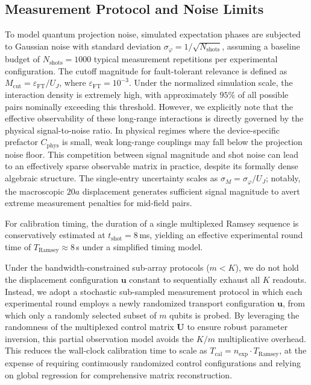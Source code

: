 \documentclass[a4paper,twocolumn,11pt]{quantumarticle}
\begin{document}
\subsection*{Measurement Protocol and Noise Limits}
To model quantum projection noise, simulated expectation phases are subjected to Gaussian noise with standard deviation $\sigma_\varphi = 1/\sqrt{N_{\text{shots}}}$, assuming a baseline budget of $N_{\text{shots}} = 1000$ typical measurement repetitions per experimental configuration.
The cutoff magnitude for fault-tolerant relevance is defined as $M_{\mathrm{cut}} = \varepsilon_{\mathrm{FT}} / U_J$, where $\varepsilon_{\mathrm{FT}} = 10^{-3}$. Under the normalized simulation scale, the interaction density is extremely high, with approximately $95\%$ of all possible pairs nominally exceeding this threshold. However, we explicitly note that the effective observability of these long-range interactions is directly governed by the physical signal-to-noise ratio. In physical regimes where the device-specific prefactor $C_{\text{phys}}$ is small, weak long-range couplings may fall below the projection noise floor. This competition between signal magnitude and shot noise can lead to an effectively sparse observable matrix in practice, despite its formally dense algebraic structure. The single-entry uncertainty scales as $\sigma_M = \sigma_\varphi / U_J$; notably, the macroscopic $20a$ displacement generates sufficient signal magnitude to avert extreme measurement penalties for mid-field pairs.

For calibration timing, the duration of a single multiplexed Ramsey sequence is conservatively estimated at $t_{\text{shot}} = 8$\,ms, yielding an effective experimental round time of $T_{\text{Ramsey}} \approx 8$\,s under a simplified timing model. 

Under the bandwidth-constrained sub-array protocols ($m < K$), we do not hold the displacement configuration $\mathbf{u}$ constant to sequentially exhaust all $K$ readouts. Instead, we adopt a stochastic sub-sampled measurement protocol in which each experimental round employs a newly randomized transport configuration $\mathbf{u}$, from which only a randomly selected subset of $m$ qubits is probed. By leveraging the randomness of the multiplexed control matrix $\mathbf{U}$ to ensure robust parameter inversion, this partial observation model avoids the $K/m$ multiplicative overhead. This reduces the wall-clock calibration time to scale as $T_{\text{cal}} = n_{\text{exp}} \cdot T_{\text{Ramsey}}$, at the expense of requiring continuously randomized control configurations and relying on global regression for comprehensive matrix reconstruction.
\end{document}
